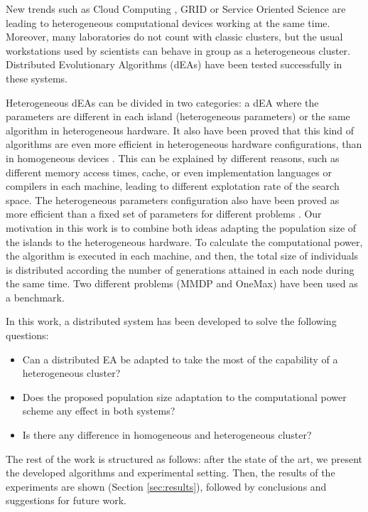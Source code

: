 New trends such as Cloud Computing \cite{CLOUD}, GRID \cite{OPENSCIENCEGRID} or Service Oriented Science \cite{GLOBUS} are leading to heterogeneous computational devices working at the same time.  Moreover, many laboratories do not count with classic clusters, but the usual workstations used by scientists can behave in group as a heterogeneous cluster. Distributed Evolutionary Algorithms (dEAs) \cite{AQUIEN} have been tested successfully in these systems. 

Heterogeneous dEAs can be divided in two categories: a dEA where the parameters are different in each island (heterogeneous parameters) or the same algorithm in heterogeneous hardware. It also have been proved that this kind of algorithms are even more efficient in heterogeneous hardware configurations, than in homogeneous devices \cite{HETEROGENEOUSHARD}. This can be explained by different reasons, such as different memory access times, cache, or even implementation languages or compilers in each machine, leading to different explotation rate of the search space. The heterogeneous parameters configuration also have been proved as more efficient than a fixed set of parameters for different problems \cite{HETEROGENEOUSPARAMETERS}. Our motivation in this work is to combine both ideas adapting the population size of the islands to the heterogeneous hardware. To calculate the computational power, the algorithm is executed in each machine, and then, the total size of individuals is distributed according the number of generations attained in each node during the same time. Two different problems (MMDP and OneMax) have been used as a benchmark.


In this work, a distributed system has been developed to solve the following questions:
\begin{itemize}
 \item Can a distributed EA be adapted to take the most of the capability of a heterogeneous cluster?
 \item Does the proposed population size adaptation to the computational power scheme any effect in both systems?
 \item Is there any difference in homogeneous and heterogeneous cluster?
\end{itemize}


The rest of the work is structured as follows: after the state of
the art, we present the developed algorithms and experimental setting. 
Then, the results of the experiments are shown (Section \ref{sec:results}), followed by conclusions and suggestions for future work.



